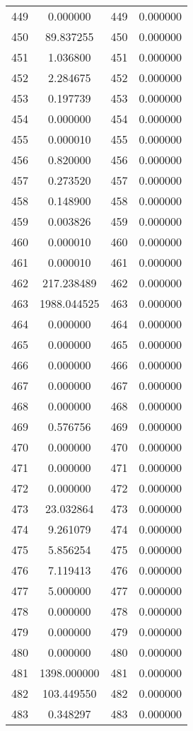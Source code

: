 \documentclass[12pt]{article}
\begin{document}
\begin{longtable}{@{}cccc@{}}
449 & 0.000000 & 449 & 0.000000 \\
450 & 89.837255 & 450 & 0.000000 \\
451 & 1.036800 & 451 & 0.000000 \\
452 & 2.284675 & 452 & 0.000000 \\
453 & 0.197739 & 453 & 0.000000 \\
454 & 0.000000 & 454 & 0.000000 \\
455 & 0.000010 & 455 & 0.000000 \\
456 & 0.820000 & 456 & 0.000000 \\
457 & 0.273520 & 457 & 0.000000 \\
458 & 0.148900 & 458 & 0.000000 \\
459 & 0.003826 & 459 & 0.000000 \\
460 & 0.000010 & 460 & 0.000000 \\
461 & 0.000010 & 461 & 0.000000 \\
462 & 217.238489 & 462 & 0.000000 \\
463 & 1988.044525 & 463 & 0.000000 \\
464 & 0.000000 & 464 & 0.000000 \\
465 & 0.000000 & 465 & 0.000000 \\
466 & 0.000000 & 466 & 0.000000 \\
467 & 0.000000 & 467 & 0.000000 \\
468 & 0.000000 & 468 & 0.000000 \\
469 & 0.576756 & 469 & 0.000000 \\
470 & 0.000000 & 470 & 0.000000 \\
471 & 0.000000 & 471 & 0.000000 \\
472 & 0.000000 & 472 & 0.000000 \\
473 & 23.032864 & 473 & 0.000000 \\
474 & 9.261079 & 474 & 0.000000 \\
475 & 5.856254 & 475 & 0.000000 \\
476 & 7.119413 & 476 & 0.000000 \\
477 & 5.000000 & 477 & 0.000000 \\
478 & 0.000000 & 478 & 0.000000 \\
479 & 0.000000 & 479 & 0.000000 \\
480 & 0.000000 & 480 & 0.000000 \\
481 & 1398.000000 & 481 & 0.000000 \\
482 & 103.449550 & 482 & 0.000000 \\
483 & 0.348297 & 483 & 0.000000 \\

\end{longtable}
\end{document}
